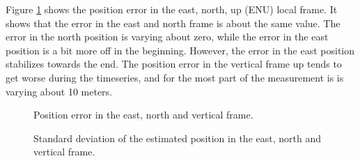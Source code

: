 \documentclass{article}
\begin{document}
Figure \ref{fig:pos_err} shows the position error in the east, north, up (ENU) local frame. It shows that the error in the east and north frame is about the same value. The error in the north position is varying about zero, while the error in the east position is a bit more off in the beginning. However, the error in the east position stabilizes towards the end. The position error in the vertical frame up tends to get worse during the timeseries, and for the most part of the measurement is is varying about 10 meters.

\begin{figure}[!ht]
    \centering
    \caption{Position error in the east, north and vertical frame.}
    \label{fig:pos_err}
\end{figure}

\begin{figure}[!ht]
    \centering
    \caption{Standard deviation of the estimated position in the east, north and vertical frame.}
    \label{fig:pos_std}
\end{figure}
\end{document}
